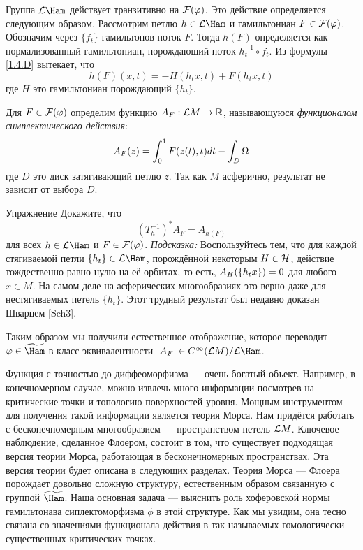 Группа $\L\Ham$ действует транзитивно на $\mathcal{F}(\varphi)$. Это
действие определяется следующим образом. Рассмотрим петлю $h\in\L\Ham$ и
гамильтониан $F\in\mathcal{F}(\varphi)$. Обозначим через $\{f_{t}\}$
гамильтонов поток $F$.
Тогда $h(F)$ определяется как нормализованный гамильтониан, порождающий поток
$h^{-1}_{t}\circ f_{t}$.
Из формулы \ref{1.4.D} вытекает, что
\[
h(F)(x,t) = -H(h_{t}x,t) + F(h_{t}x,t)
\]
где $H$ это гамильтониан порождающий $\{h_{t}\}$.

Для $F\in\mathcal{F}(\varphi)$ определим функцию $A_{F}:\mathcal{L} M\to\mathbb{R}$,
называющуюся \textit{функционалом симплектического действия}:
\[
A_{F}(z)=\int_{0}^{1}F(z(t),t)d t - \int_{D}\Omega
\]
где $D$ это диск затягивающий петлю $z$.
Так как $M$ асферично, результат не зависит от выбора $D$.

\begin{ex}{Упражнение}\label{13.1.A}
Докажите, что
\[
(T_{h}^{-1})^{*}A_{F}= A _{h(F)}
\]
для всех $h\in\L\Ham$ и $F\in\mathcal{F}(\varphi)$.
\textit{Подсказка:}
Воспользуйтесь тем, что для каждой стягиваемой петли $\{h_{t}\}\in\L\Ham$, порождённой некоторым $H\in\mathcal{H}$, действие тождественно равно нулю на её орбитах, то есть, $A_{H}(\{h_{t}x\}) \z= 0$ для любого $x\in M$.
На самом деле на асферических многообразиях это верно даже для нестягиваемых петель $\{h_{t}\}$.
Этот трудный результат был недавно доказан Шварцем [Sch3].
\end{ex}

Таким образом мы получили естественное отображение, которое переводит
$\phi\in\widetilde\Ham$ в класс эквивалентности $[A_{F}]\in C^{\infty} (\L M)/\L\Ham$.

Функция с точностью до диффеоморфизма — очень богатый объект.
Например, в конечномерном случае, можно извлечь много информации посмотрев на критические точки и топологию поверхностей уровня.
Мощным инструментом для получения такой информации является теория Морса.
Нам придётся работать с бесконечномерным многообразием — пространством петель $\mathcal{L} M$.
Ключевое наблюдение, сделанное Флоером, состоит в том, что существует подходящая версия теории Морса, работающая в бесконечномерных пространствах.
Эта версия теории будет описана в следующих разделах.
Теория Морса — Флоера порождает довольно сложную структуру, естественным образом связанную 
с группой $\widetilde\Ham$.
Наша основная задача — выяснить роль
хоферовской нормы гамильтонава сиплектоморфизма $\phi$ в этой структуре.
Как мы увидим, она тесно связана со значениями функционала действия
в так называемых гомологически существенных критических точках. 

